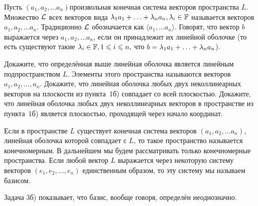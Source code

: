 \documentclass[a4paper,12pt,fleqn]{article}
\begin{document}
Пусть $(a_1, a_2, \ldots a_n)$\т произвольная конечная система векторов пространства $L$. Множество $\mathcal{L}$ всех векторов вида $\lambda_1a_1+\ldots+\lambda_na_n, \lambda_i\in \mathbb{F}$ называется  векторов $a_1, a_2, \ldots a_n$. Традиционно $\mathcal{L}$ обозначается как $\langle a_1, \ldots a_n\rangle$. Говорят, что вектор $b$  выражается через $a_1, a_2, \ldots a_n$, если он принадлежит их линейной оболочке (то есть существуют такие $\lambda_i\in \mathbb{F}, 1\leqslant i\leqslant n,$ что $b=\lambda_1a_1+\ldots+\lambda_na_n$).

Докажите, что определённая выше линейная оболочка является линейным подпространством $L$. Элементы этого пространства называются  векторов $a_1, a_2, \ldots, a_n$.
Докажите, что линейная оболочка любых двух неколлинеарных векторов на плоскости из пункта~1б) совпадает со всей плоскостью.
Докажите, что линейная оболочка любых двух неколлинеарных векторов в пространстве из пункта~1б) является плоскостью, проходящей через начало координат.

Если в пространстве $L$ существует конечная система векторов $(a_1, a_2, \ldots a_n)$, линейная оболочка которой совпадает с $L$, то такое пространство называется  конечномерным. В дальнейшем мы будем рассматривать только конечномерные пространства. Если любой вектор $L$ выражается через некоторую систему векторов $(e_1, e_2, \ldots, e_n)$ единственным образом, то эту систему мы называем  базисом.

Задача 3б) показывает, что базис, вообще говоря, определён неоднозначно.
\end{document}
